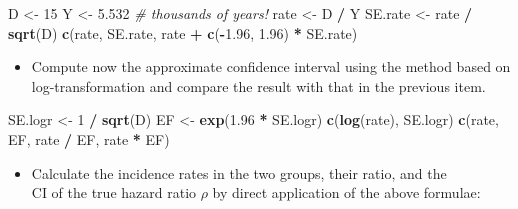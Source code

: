 \documentclass[
]{book}
\newenvironment{Shaded}{\begin{snugshade}}{\end{snugshade}}
\newcommand{\CommentTok}[1]{\textcolor[rgb]{0.56,0.35,0.01}{\textit{#1}}}
\newcommand{\DecValTok}[1]{\textcolor[rgb]{0.00,0.00,0.81}{#1}}
\newcommand{\FloatTok}[1]{\textcolor[rgb]{0.00,0.00,0.81}{#1}}
\newcommand{\FunctionTok}[1]{\textcolor[rgb]{0.13,0.29,0.53}{\textbf{#1}}}
\newcommand{\NormalTok}[1]{#1}
\newcommand{\OtherTok}[1]{\textcolor[rgb]{0.56,0.35,0.01}{#1}}
\newcommand{\SpecialCharTok}[1]{\textcolor[rgb]{0.81,0.36,0.00}{\textbf{#1}}}
\providecommand{\tightlist}{%
  \setlength{\itemsep}{0pt}\setlength{\parskip}{0pt}}
\begin{document}
\begin{Shaded}
\begin{Highlighting}[]
\NormalTok{D }\OtherTok{\textless{}{-}} \DecValTok{15}
\NormalTok{Y }\OtherTok{\textless{}{-}} \FloatTok{5.532} \CommentTok{\# thousands of years!}
\NormalTok{rate }\OtherTok{\textless{}{-}}\NormalTok{ D }\SpecialCharTok{/}\NormalTok{ Y}
\NormalTok{SE.rate }\OtherTok{\textless{}{-}}\NormalTok{ rate }\SpecialCharTok{/} \FunctionTok{sqrt}\NormalTok{(D)}
\FunctionTok{c}\NormalTok{(rate, SE.rate, rate }\SpecialCharTok{+} \FunctionTok{c}\NormalTok{(}\SpecialCharTok{{-}}\FloatTok{1.96}\NormalTok{, }\FloatTok{1.96}\NormalTok{) }\SpecialCharTok{*}\NormalTok{ SE.rate)}
\end{Highlighting}
\end{Shaded}

\begin{itemize}
\tightlist
\item
  Compute now the approximate confidence interval using the method
  based on log-transformation and compare the result with that in the previous item.
\end{itemize}

\begin{Shaded}
\begin{Highlighting}[]
\NormalTok{SE.logr }\OtherTok{\textless{}{-}} \DecValTok{1} \SpecialCharTok{/} \FunctionTok{sqrt}\NormalTok{(D)}
\NormalTok{EF }\OtherTok{\textless{}{-}} \FunctionTok{exp}\NormalTok{(}\FloatTok{1.96} \SpecialCharTok{*}\NormalTok{ SE.logr)}
\FunctionTok{c}\NormalTok{(}\FunctionTok{log}\NormalTok{(rate), SE.logr)}
\FunctionTok{c}\NormalTok{(rate, EF, rate }\SpecialCharTok{/}\NormalTok{ EF, rate }\SpecialCharTok{*}\NormalTok{ EF)}
\end{Highlighting}
\end{Shaded}

\begin{itemize}
\tightlist
\item
  Calculate the incidence rates in the two groups, their ratio, and the\\
  CI of the true hazard ratio \(\rho\) by direct application of the above formulae:
\end{itemize}
\end{document}
